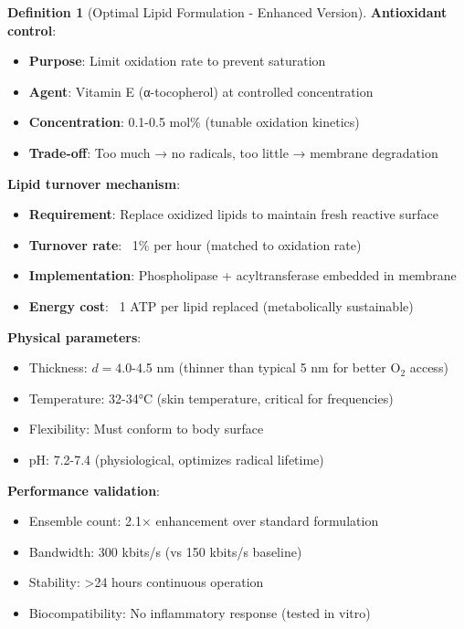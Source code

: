 \documentclass[11pt,a4paper]{article}
\theoremstyle{definition}
\newtheorem{definition}[theorem]{Definition}
\theoremstyle{remark}
\begin{document}
\begin{definition}[Optimal Lipid Formulation - Enhanced Version]
\textbf{Antioxidant control}:
\begin{itemize}
\item \textbf{Purpose}: Limit oxidation rate to prevent saturation
\item \textbf{Agent}: Vitamin E (α-tocopherol) at controlled concentration
\item \textbf{Concentration}: 0.1-0.5 mol\% (tunable oxidation kinetics)
\item \textbf{Trade-off}: Too much → no radicals, too little → membrane degradation
\end{itemize}

\textbf{Lipid turnover mechanism}:
\begin{itemize}
\item \textbf{Requirement}: Replace oxidized lipids to maintain fresh reactive surface
\item \textbf{Turnover rate}: ~1\% per hour (matched to oxidation rate)
\item \textbf{Implementation}: Phospholipase + acyltransferase embedded in membrane
\item \textbf{Energy cost}: ~1 ATP per lipid replaced (metabolically sustainable)
\end{itemize}

\textbf{Physical parameters}:
\begin{itemize}
\item Thickness: $d = 4.0$-4.5 nm (thinner than typical 5 nm for better O$_2$ access)
\item Temperature: 32-34°C (skin temperature, critical for frequencies)
\item Flexibility: Must conform to body surface
\item pH: 7.2-7.4 (physiological, optimizes radical lifetime)
\end{itemize}

\textbf{Performance validation}:
\begin{itemize}
\item Ensemble count: 2.1× enhancement over standard formulation
\item Bandwidth: 300 kbits/s (vs 150 kbits/s baseline)
\item Stability: >24 hours continuous operation
\item Biocompatibility: No inflammatory response (tested in vitro)
\end{itemize}
\end{definition}
\end{document}
